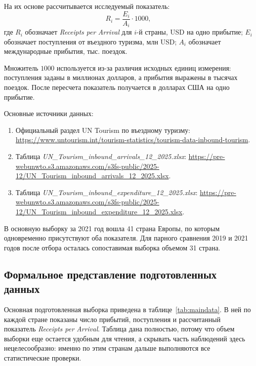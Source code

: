 \documentclass[14pt,a4paper]{extarticle}
\begin{document}
На их основе рассчитывается исследуемый показатель:
\begin{equation}
R_i = \frac{E_i}{A_i} \cdot 1000,
\end{equation}
где $R_i$ обозначает \textit{Receipts per Arrival} для $i$-й страны, USD на одно прибытие; $E_i$ обозначает поступления от въездного туризма, млн USD; $A_i$ обозначает международные прибытия, тыс. поездок.

Множитель $1000$ используется из-за различия исходных единиц измерения: поступления заданы в миллионах долларов, а прибытия выражены в тысячах поездок. После пересчета показатель получается в долларах США на одно прибытие.

Основные источники данных:
\begin{enumerate}[leftmargin=1.25cm]
    \item Официальный раздел UN Tourism по въездному туризму: \url{https://www.untourism.int/tourism-statistics/tourism-data-inbound-tourism}.
    \item Таблица \textit{UN\_Tourism\_inbound\_arrivals\_12\_2025.xlsx}: \url{https://pre-webunwto.s3.amazonaws.com/s3fs-public/2025-12/UN_Tourism_inbound_arrivals_12_2025.xlsx}.
    \item Таблица \textit{UN\_Tourism\_inbound\_expenditure\_12\_2025.xlsx}: \url{https://pre-webunwto.s3.amazonaws.com/s3fs-public/2025-12/UN_Tourism_inbound_expenditure_12_2025.xlsx}.
\end{enumerate}

В основную выборку за 2021 год вошла 41 страна Европы, по которым одновременно присутствуют оба показателя. Для парного сравнения 2019 и 2021 годов после отбора осталась сопоставимая выборка объемом 31 страна.

\subsection{Формальное представление подготовленных данных}

Основная подготовленная выборка приведена в таблице~\ref{tab:maindata}. В ней по каждой стране показаны число прибытий, поступления и рассчитанный показатель \textit{Receipts per Arrival}. Таблица дана полностью, потому что объем выборки еще остается удобным для чтения, а скрывать часть наблюдений здесь нецелесообразно: именно по этим странам дальше выполняются все статистические проверки.
\end{document}
